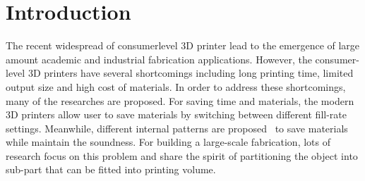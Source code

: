 \section{Introduction}
\label{sec:introduction}

The recent widespread of consumer\chinky{-}level 3D printer lead to the emergence of large amount academic and industrial fabrication applications.
However, the consumer-level 3D printers have several shortcomings including long printing time, limited output size and  high cost of materials. 
In order to address these shortcomings, many of the researches are proposed.
For saving time and materials, the modern 3D printers allow user to save materials by switching between different fill-rate settings.
Meanwhile, different internal patterns are proposed~\cite{Lu:2014:BSW} to save materials while maintain the  soundness.
For building a large-scale fabrication, lots of research \cite{Medell:2007:ALRP, Hao:2011:APLM, Luo:2012:CPM, Hu:2014:APS, Vanek:2014:PMVO} focus on this problem and share the spirit of partitioning the object into sub-part that can be fitted into printing volume.

